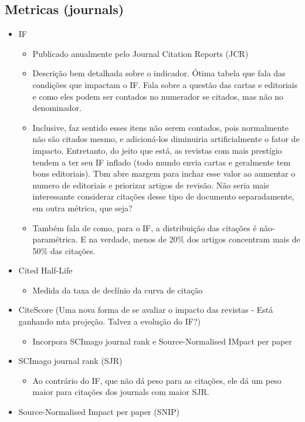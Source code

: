 \documentclass[11pt]{article}
\begin{document}
\subsection{Metricas (journals)}
\label{sec:org0a22cfe}
\begin{itemize}
\item IF
\begin{itemize}
\item Publicado anualmente pelo Journal Citation Reports (JCR)
\item Descrição bem detalhada sobre o indicador. Ótima tabela que fala das condições que impactam o IF. Fala sobre a questão das cartas e editoriais e como eles podem ser contados no numerador se citados, mas não no denominador.
\item Inclusive, faz sentido esses itens não serem contados, pois normalmente não são citados mesmo, e adicioná-los diminuiria artificialmente o fator de impacto. Entretanto, do jeito que está, as revistas com mais prestígio tendem a ter seu IF inflado (todo mundo envia cartas e geralmente tem bons editoriais). Tbm abre margem para inchar esse valor ao aumentar o numero de editoriais e priorizar artigos de revisão. Não seria mais interessante considerar citações desse tipo de documento separadamente, em outra métrica, que seja?
\item Também fala de como, para o IF, a distribuição das citações é não-paramétrica. E na verdade, menos de 20\% dos artigos concentram mais de 50\% das citações.
\end{itemize}
\item Cited Half-Life
\begin{itemize}
\item Medida da taxa de declínio da curva de citação
\end{itemize}
\item CiteScore (Uma nova forma de se avaliar o impacto das revistas - Está ganhando mta projeção. Talvez a evolução do IF?)
\begin{itemize}
\item Incorpora SCImago journal rank e Source-Normalised IMpact per paper
\end{itemize}
\item SCImago journal rank (SJR)
\begin{itemize}
\item Ao contrário do IF, que não dá peso para as citações, ele dá um peso maior para citações dos journals com maior SJR.
\end{itemize}
\item Source-Normalised Impact per paper (SNIP)

\end{itemize}
\end{document}
